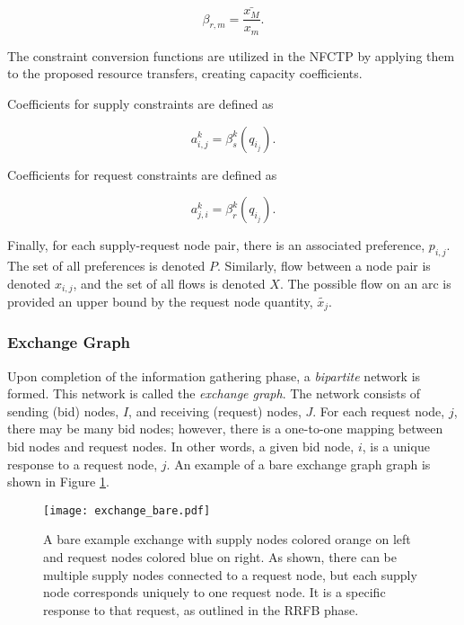 \begin{equation}
  \beta_{r, m} = \frac{\bar{x_M}}{x_m}.
\end{equation}

The constraint conversion functions are utilized in the NFCTP by applying them
to the proposed resource transfers, creating capacity coefficients.

Coefficients for supply constraints are defined as

\begin{equation}
  a^k_{i, j} = \beta_s^k(q_{i_j}).
\end{equation}

Coefficients for request constraints are defined as

\begin{equation}
  a^k_{j, i} = \beta_r^k(q_{i_j}).
\end{equation}

Finally, for each supply-request node pair, there is an associated preference,
$p_{i, j}$. The set of all preferences is denoted $P$. Similarly, flow between a
node pair is denoted $x_{i, j}$, and the set of all flows is denoted $X$. The
possible flow on an arc is provided an upper bound by the request node quantity,
$\tilde{x_j}$.

\subsubsection{Exchange Graph}

Upon completion of the information gathering phase, a \textit{bipartite} network
is formed. This network is called the \textit{exchange graph}. The network
consists of sending (bid) nodes, $I$, and receiving (request) nodes, $J$. For
each request node, $j$, there may be many bid nodes; however, there is a
one-to-one mapping between bid nodes and request nodes. In other words, a given
bid node, $i$, is a unique response to a request node, $j$. An example of a bare
exchange graph graph is shown in Figure \ref{fig:ex_bare}.

\begin{figure}
  \begin{center}
    \texttt{[image: exchange\_bare.pdf]}
    \caption{A bare example exchange with supply nodes colored orange on left
      and request nodes colored blue on right. As shown, there can be multiple
      supply nodes connected to a request node, but each supply node corresponds
      uniquely to one request node. It is a specific response to that request,
      as outlined in the RRFB phase.}
    \label{fig:ex_bare}
  \end{center}
\end{figure}

